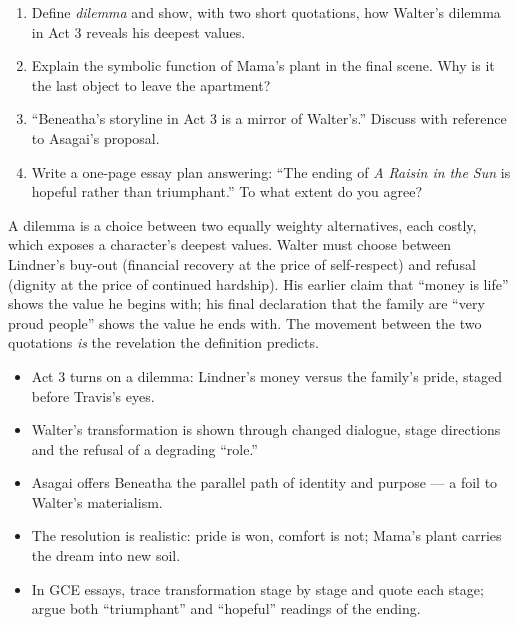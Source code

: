 \documentclass[11pt]{article}
\begin{document}
\begin{exercice}[Practice]
\begin{enumerate}
\item Define \emph{dilemma} and show, with two short quotations, how Walter's dilemma in Act 3 reveals his deepest values.
\item Explain the symbolic function of Mama's plant in the final scene. Why is it the last object to leave the apartment?
\item ``Beneatha's storyline in Act 3 is a mirror of Walter's.'' Discuss with reference to Asagai's proposal.
\item Write a one-page essay plan answering: ``The ending of \emph{A Raisin in the Sun} is hopeful rather than triumphant.'' To what extent do you agree?
\end{enumerate}
\end{exercice}

\begin{corrige}
A dilemma is a choice between two equally weighty alternatives, each costly, which exposes a character's deepest values. Walter must choose between Lindner's buy-out (financial recovery at the price of self-respect) and refusal (dignity at the price of continued hardship). His earlier claim that ``money is life'' shows the value he begins with; his final declaration that the family are ``very proud people'' shows the value he ends with. The movement between the two quotations \emph{is} the revelation the definition predicts.
\end{corrige}

\begin{aretenir}
\begin{itemize}
\item Act 3 turns on a dilemma: Lindner's money versus the family's pride, staged before Travis's eyes.
\item Walter's transformation is shown through changed dialogue, stage directions and the refusal of a degrading ``role.''
\item Asagai offers Beneatha the parallel path of identity and purpose — a foil to Walter's materialism.
\item The resolution is realistic: pride is won, comfort is not; Mama's plant carries the dream into new soil.
\item In GCE essays, trace transformation stage by stage and quote each stage; argue both ``triumphant'' and ``hopeful'' readings of the ending.
\end{itemize}
\end{aretenir}
\end{document}
